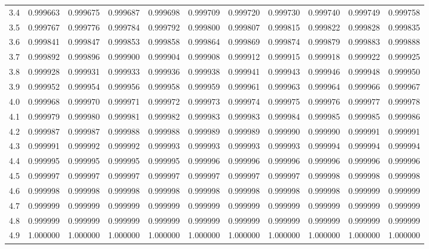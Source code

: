 \documentclass[12pt, a6paper]{extarticle}
\begin{document}
\begin{center}
\begin{tabular}{lllllllllll}
3.4& 0.999663&0.999675&0.999687&0.999698&0.999709&0.999720&0.999730&0.999740&0.999749&0.999758 \\
3.5& 0.999767&0.999776&0.999784&0.999792&0.999800&0.999807&0.999815&0.999822&0.999828&0.999835 \\
3.6& 0.999841&0.999847&0.999853&0.999858&0.999864&0.999869&0.999874&0.999879&0.999883&0.999888 \\
3.7& 0.999892&0.999896&0.999900&0.999904&0.999908&0.999912&0.999915&0.999918&0.999922&0.999925 \\
3.8& 0.999928&0.999931&0.999933&0.999936&0.999938&0.999941&0.999943&0.999946&0.999948&0.999950 \\
3.9& 0.999952&0.999954&0.999956&0.999958&0.999959&0.999961&0.999963&0.999964&0.999966&0.999967 \\
4.0& 0.999968&0.999970&0.999971&0.999972&0.999973&0.999974&0.999975&0.999976&0.999977&0.999978 \\
4.1& 0.999979&0.999980&0.999981&0.999982&0.999983&0.999983&0.999984&0.999985&0.999985&0.999986 \\
4.2& 0.999987&0.999987&0.999988&0.999988&0.999989&0.999989&0.999990&0.999990&0.999991&0.999991 \\
4.3& 0.999991&0.999992&0.999992&0.999993&0.999993&0.999993&0.999993&0.999994&0.999994&0.999994 \\
4.4& 0.999995&0.999995&0.999995&0.999995&0.999996&0.999996&0.999996&0.999996&0.999996&0.999996 \\
4.5& 0.999997&0.999997&0.999997&0.999997&0.999997&0.999997&0.999997&0.999998&0.999998&0.999998 \\
4.6& 0.999998&0.999998&0.999998&0.999998&0.999998&0.999998&0.999998&0.999998&0.999999&0.999999 \\
4.7& 0.999999&0.999999&0.999999&0.999999&0.999999&0.999999&0.999999&0.999999&0.999999&0.999999 \\
4.8& 0.999999&0.999999&0.999999&0.999999&0.999999&0.999999&0.999999&0.999999&0.999999&0.999999 \\
4.9& 1.000000&1.000000&1.000000&1.000000&1.000000&1.000000&1.000000&1.000000&1.000000&1.000000
\end{tabular}
\end{center}
\end{document}
